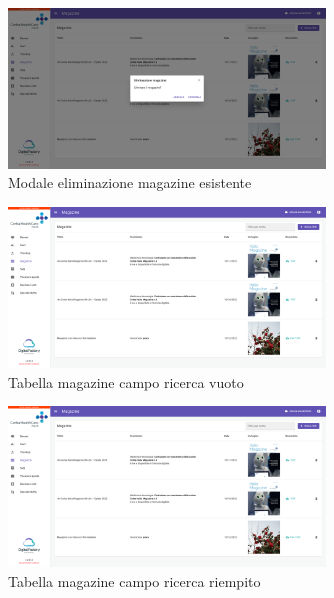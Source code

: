 \begin{figure}[H]
    \centering
    \includegraphics[width=0.75\textwidth]{images/capitolo5/f6_magazines/ModalMagazine_delete.png} 
    \caption{Modale eliminazione magazine esistente} 
    \label{fig:ModalMagazine_delete}
\end{figure}

\begin{figure}[H]
    \centering
    \includegraphics[width=0.75\textwidth]{images/capitolo5/f6_magazines/PageMagazines_searchEmpty.png} 
    \caption{Tabella magazine campo ricerca vuoto} 
    \label{fig:PageMagazine_searchEmpty}
\end{figure}

\begin{figure}[H]
    \centering
    \includegraphics[width=0.75\textwidth]{images/capitolo5/f6_magazines/PageMagazines_searchEmpty.png} 
    \caption{Tabella magazine campo ricerca riempito} 
    \label{fig:PageMagazine_searchFilled}
\end{figure}


